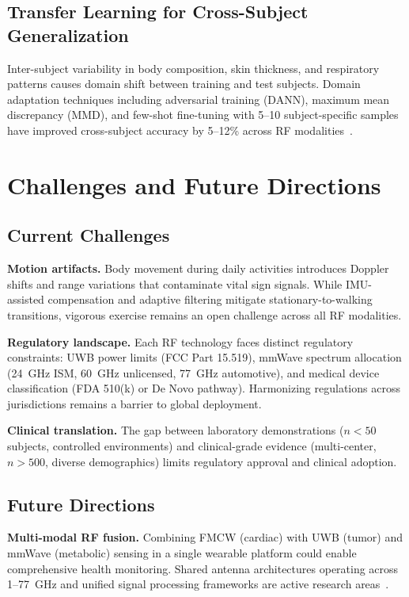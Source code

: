 \documentclass[journal,twoside]{IEEEtran}
\begin{document}
\subsection{Transfer Learning for Cross-Subject Generalization}
Inter-subject variability in body composition, skin thickness, and respiratory patterns causes domain shift between training and test subjects. Domain adaptation techniques including adversarial training (DANN), maximum mean discrepancy (MMD), and few-shot fine-tuning with 5--10 subject-specific samples have improved cross-subject accuracy by 5--12\% across RF modalities~\cite{ref_transfer_rf2024}.

\section{Challenges and Future Directions}

\subsection{Current Challenges}
\textbf{Motion artifacts.} Body movement during daily activities introduces Doppler shifts and range variations that contaminate vital sign signals. While IMU-assisted compensation and adaptive filtering mitigate stationary-to-walking transitions, vigorous exercise remains an open challenge across all RF modalities.

\textbf{Regulatory landscape.} Each RF technology faces distinct regulatory constraints: UWB power limits (FCC Part 15.519), mmWave spectrum allocation (24~GHz ISM, 60~GHz unlicensed, 77~GHz automotive), and medical device classification (FDA 510(k) or De Novo pathway). Harmonizing regulations across jurisdictions remains a barrier to global deployment.

\textbf{Clinical translation.} The gap between laboratory demonstrations ($n < 50$ subjects, controlled environments) and clinical-grade evidence (multi-center, $n > 500$, diverse demographics) limits regulatory approval and clinical adoption.

\subsection{Future Directions}

\textbf{Multi-modal RF fusion.} Combining FMCW (cardiac) with UWB (tumor) and mmWave (metabolic) sensing in a single wearable platform could enable comprehensive health monitoring. Shared antenna architectures operating across 1--77~GHz and unified signal processing frameworks are active research areas~\cite{ref_fusion2025}.
\end{document}

